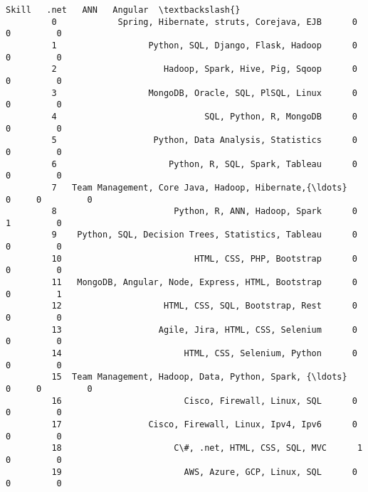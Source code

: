 \documentclass[11pt]{article}
\begin{document}
\begin{Verbatim}[commandchars=\\\{\}]
                                                         Skill   .net   ANN   Angular  \textbackslash{}
         0            Spring, Hibernate, struts, Corejava, EJB      0     0         0   
         1                  Python, SQL, Django, Flask, Hadoop      0     0         0   
         2                     Hadoop, Spark, Hive, Pig, Sqoop      0     0         0   
         3                  MongoDB, Oracle, SQL, PlSQL, Linux      0     0         0   
         4                             SQL, Python, R, MongoDB      0     0         0   
         5                   Python, Data Analysis, Statistics      0     0         0   
         6                      Python, R, SQL, Spark, Tableau      0     0         0   
         7   Team Management, Core Java, Hadoop, Hibernate,{\ldots}      0     0         0   
         8                       Python, R, ANN, Hadoop, Spark      0     1         0   
         9    Python, SQL, Decision Trees, Statistics, Tableau      0     0         0   
         10                          HTML, CSS, PHP, Bootstrap      0     0         0   
         11   MongoDB, Angular, Node, Express, HTML, Bootstrap      0     0         1   
         12                    HTML, CSS, SQL, Bootstrap, Rest      0     0         0   
         13                   Agile, Jira, HTML, CSS, Selenium      0     0         0   
         14                        HTML, CSS, Selenium, Python      0     0         0   
         15  Team Management, Hadoop, Data, Python, Spark, {\ldots}      0     0         0   
         16                        Cisco, Firewall, Linux, SQL      0     0         0   
         17                 Cisco, Firewall, Linux, Ipv4, Ipv6      0     0         0   
         18                      C\#, .net, HTML, CSS, SQL, MVC      1     0         0   
         19                        AWS, Azure, GCP, Linux, SQL      0     0         0   
         

\end{Verbatim}
\end{document}
